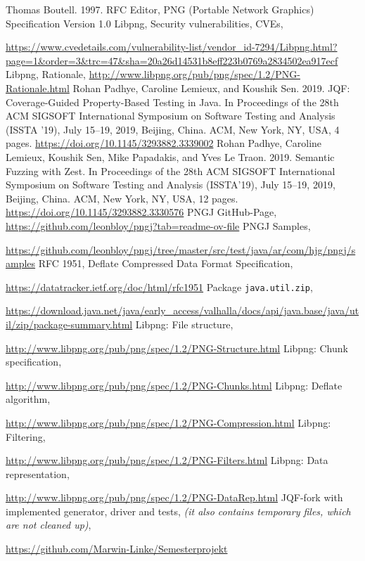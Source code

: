 \documentclass[runningheads]{llncs}
\begin{document}
%
%
%
% 
% 
%
\begin{thebibliography}{8}
Thomas Boutell. 1997. RFC Editor, PNG (Portable Network Graphics) Specification Version 1.0
Libpng, Security vulnerabilities, CVEs,

\url{https://www.cvedetails.com/vulnerability-list/vendor\_id-7294/Libpng.html?page=1\&order=3\&trc=47\&sha=20a26d14531b8eff223b0769a2834502ea917ecf}
Libpng, Rationale,
\url{http://www.libpng.org/pub/png/spec/1.2/PNG-Rationale.html}
Rohan Padhye, Caroline Lemieux, and Koushik Sen. 2019. JQF: Coverage-Guided Property-Based Testing in Java. In Proceedings of the 28th ACM SIGSOFT International Symposium on Software Testing and Analysis (ISSTA ’19), July 15–19, 2019, Beijing, China. ACM, New York, NY, USA, 4 pages. \url{https://doi.org/10.1145/3293882.3339002}
Rohan Padhye, Caroline Lemieux, Koushik Sen, Mike Papadakis, and Yves Le Traon. 2019. Semantic Fuzzing with Zest. In Proceedings of the 28th ACM SIGSOFT International Symposium on Software Testing and Analysis (ISSTA’19), July 15–19, 2019, Beijing, China. ACM, New York, NY, USA, 12 pages. \url{https://doi.org/10.1145/3293882.3330576}
PNGJ GitHub-Page, \url{https://github.com/leonbloy/pngj?tab=readme-ov-file}
PNGJ Samples, 

\url{https://github.com/leonbloy/pngj/tree/master/src/test/java/ar/com/hjg/pngj/samples}
RFC 1951, Deflate Compressed Data Format Specification,

\url{https://datatracker.ietf.org/doc/html/rfc1951}
Package \texttt{java.util.zip},

\url{https://download.java.net/java/early\_access/valhalla/docs/api/java.base/java/util/zip/package-summary.html}
Libpng: File structure,

\url{http://www.libpng.org/pub/png/spec/1.2/PNG-Structure.html}
Libpng: Chunk specification, 

\url{http://www.libpng.org/pub/png/spec/1.2/PNG-Chunks.html}
Libpng: Deflate algorithm,

\url{http://www.libpng.org/pub/png/spec/1.2/PNG-Compression.html}
Libpng: Filtering,

\url{http://www.libpng.org/pub/png/spec/1.2/PNG-Filters.html}
Libpng: Data representation,

\url{http://www.libpng.org/pub/png/spec/1.2/PNG-DataRep.html}
JQF-fork with implemented generator, driver and tests,
\textit{(it also contains temporary files, which are not cleaned up)},

\url{https://github.com/Marwin-Linke/Semesterprojekt}

\end{thebibliography}
\end{document}
